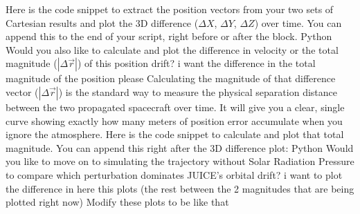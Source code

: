 {}\markdownRendererSectionBegin
{}\markdownRendererInterblockSeparator
{}Here is the code snippet to extract the position vectors from your two sets of Cartesian results and plot the 3D difference ($\Delta X$, $\Delta Y$, $\Delta Z$) over time. You can append this to the end of your script, right before or after the  block.\markdownRendererInterblockSeparator
{}Python\markdownRendererInterblockSeparator
{}\markdownRendererInterblockSeparator
{}Would you also like to calculate and plot the difference in velocity or the total magnitude ($|\Delta \vec{r}|$) of this position drift?\markdownRendererInterblockSeparator
{}\markdownRendererThematicBreak{}\markdownRendererInterblockSeparator
{}
\markdownRendererSectionEnd \markdownRendererSectionBegin
{}\markdownRendererInterblockSeparator
{}i want the difference in the total magnitude of the position please\markdownRendererInterblockSeparator
{}
\markdownRendererSectionEnd \markdownRendererSectionBegin
{}\markdownRendererInterblockSeparator
{}Calculating the magnitude of that difference vector ($| \Delta \vec{r} |$) is the standard way to measure the physical separation distance between the two propagated spacecraft over time. It will give you a clear, single curve showing exactly how many meters of position error accumulate when you ignore the atmosphere.\markdownRendererInterblockSeparator
{}Here is the code snippet to calculate and plot that total magnitude. You can append this right after the 3D difference plot:\markdownRendererInterblockSeparator
{}Python\markdownRendererInterblockSeparator
{}\markdownRendererInterblockSeparator
{}Would you like to move on to simulating the trajectory without Solar Radiation Pressure to compare which perturbation dominates JUICE's orbital drift?\markdownRendererInterblockSeparator
{}\markdownRendererThematicBreak{}\markdownRendererInterblockSeparator
{}
\markdownRendererSectionEnd \markdownRendererSectionBegin
{}\markdownRendererInterblockSeparator
{}i want to plot the difference in here this plots (the rest between the 2 magnitudes that are being plotted right now) Modify these plots to be like that\markdownRendererInterblockSeparator
{}
\markdownRendererSectionEnd 
\markdownRendererSectionEnd \markdownRendererSectionBegin
